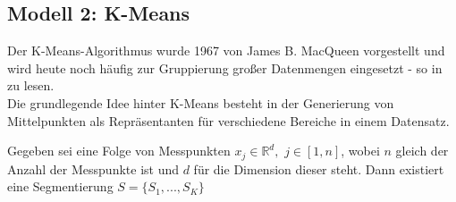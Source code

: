 	\subsection{Modell 2: K-Means}
	\label{sec:meth2}
	
		Der K-Means-Algorithmus wurde 1967 von James B. MacQueen \cite{macqueen-kmeans} vorgestellt und wird heute noch häufig zur Gruppierung großer Datenmengen eingesetzt - so in \cite{kmeans-info} zu lesen.\\
		Die grundlegende Idee hinter K-Means besteht in der Generierung von Mittelpunkten als Repräsentanten für verschiedene Bereiche in einem Datensatz. 
		\begin{definition}
			\label{def:kmeans1}
			Gegeben sei eine Folge von Messpunkten $x_{j} \in \mathbb{R}^{d},$ $j \in [1,n]$, wobei $n$ gleich der Anzahl der Messpunkte ist und $d$ für die Dimension dieser steht. Dann existiert eine Segmentierung $S = \{S_{1}, ..., S_{K}\}$
		\end{definition}